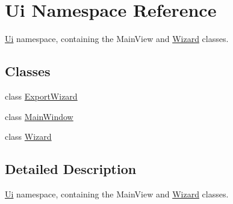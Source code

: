 \hypertarget{namespace_ui}{}\section{Ui Namespace Reference}
\label{namespace_ui}


\hyperlink{namespace_ui}{Ui} namespace, containing the Main\+View and \hyperlink{class_ui_1_1_wizard}{Wizard} classes.  


\subsection*{Classes}
\begin{DoxyCompactItemize}
\item 
class \hyperlink{class_ui_1_1_export_wizard}{Export\+Wizard}
\item 
class \hyperlink{class_ui_1_1_main_window}{Main\+Window}
\item 
class \hyperlink{class_ui_1_1_wizard}{Wizard}
\end{DoxyCompactItemize}


\subsection{Detailed Description}
\hyperlink{namespace_ui}{Ui} namespace, containing the Main\+View and \hyperlink{class_ui_1_1_wizard}{Wizard} classes. 